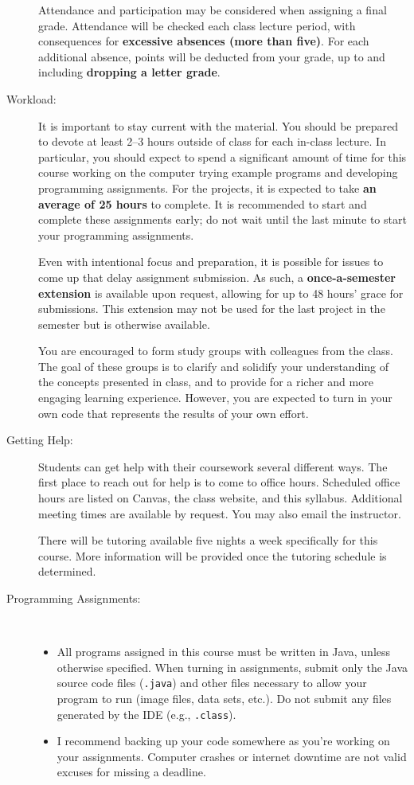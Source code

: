 \documentclass [letterpaper,11pt]{article}
\begin{document}
\begin{description}
Attendance and participation may be considered when assigning a final grade.
Attendance will be checked each class lecture period, with consequences for \textbf{excessive absences (more than five)}.  For each additional absence, points will be deducted from your grade, up to and including \textbf{dropping a letter grade}.

\item[Workload:]
It is important to stay current with the material.  You should be prepared to devote at least 2--3 hours outside of class for each in-class lecture.  In particular, you should expect to spend a significant amount of time for this course working on the computer trying example programs and developing programming assignments. For the projects, it is expected to take \textbf{an average of 25 hours} to complete. It is recommended to start and complete these assignments early; do not wait until the last minute to start your programming assignments. 

Even with intentional focus and preparation, it is possible for issues to come up that delay assignment submission.  As such, a \textbf{once-a-semester extension} is available upon request, allowing for up to 48 hours' grace for submissions. This extension may not be used for the last project in the semester but is otherwise available.

You are encouraged to form study groups with colleagues from the class. The goal of these groups is to clarify and solidify your understanding of the concepts presented in class, and to provide for a richer and more engaging learning experience. However, you are expected to turn in your own code that represents the results of your own effort.

\item[Getting Help:]
Students can get help with their coursework several different ways. The first place to
reach out for help is to come to office hours. Scheduled office hours are listed on Canvas, the class website, and this syllabus.
Additional meeting times are available by request. You may also email the instructor.

There will be tutoring available five nights a week specifically for this course. More information will be provided
once the tutoring schedule is determined.

\item[Programming Assignments:]\

\begin{itemize}\setlength{\itemsep}{0em}\setlength{\parskip}{0pt}
	\item All programs assigned in this course must be written in Java, unless otherwise specified.  When turning in assignments,
	submit only the Java source code files (\texttt{.java}) and other files necessary to allow your program to run (image files, data sets, etc.). Do not submit any files generated by the IDE (e.g., \texttt{.class}).	
			\item I recommend backing up your code somewhere as you're working on your assignments.  Computer
		crashes or internet downtime are not valid excuses for missing a deadline.
				

\end{itemize}
\end{description}
\end{document}

